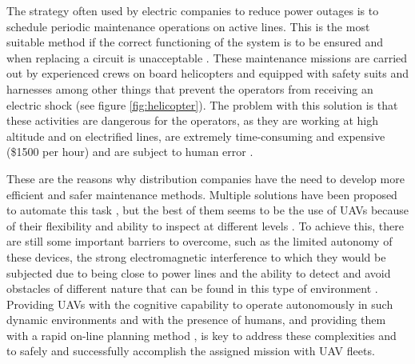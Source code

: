 The strategy often used by electric companies to reduce power outages is to schedule periodic maintenance operations on active lines. This is the most suitable method if the correct functioning of the system is to be ensured and when replacing a circuit is unacceptable \cite{PowerOutagesCauses}. These maintenance missions are carried out by experienced crews on board helicopters and equipped with safety suits and harnesses among other things that prevent the operators from receiving an electric shock (see figure \ref{fig:helicopter}). The problem with this solution is that these activities are dangerous for the operators, as they are working at high altitude and on electrified lines, are extremely time-consuming and expensive (\$1500 per hour) and are subject to human error \cite{MaintenanceCost}.

These are the reasons why distribution companies have the need to develop more efficient and safer maintenance methods. Multiple solutions have been proposed to automate this task \cite{MaintenanceSolutions}, but the best of them seems to be the use of \glspl{UAV} because of their flexibility and ability to inspect at different levels \cite{PowerOutagesCauses}. To achieve this, there are still some important barriers to overcome, such as the limited autonomy of these devices, the strong electromagnetic interference to which they would be subjected due to being close to power lines and the ability to detect and avoid obstacles of different nature that can be found in this type of environment \cite{MaintenanceCost}. Providing \glspl{UAV} with the cognitive capability to operate autonomously in such dynamic environments and with the presence of humans, and providing them with a rapid on-line planning method \cite{FastOnlinePlanning}, is key to address these complexities and to safely and successfully accomplish the assigned mission with \gls{UAV} fleets.

